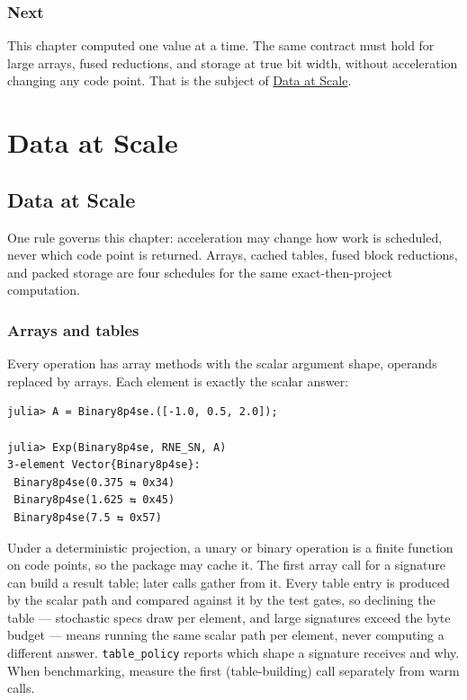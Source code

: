 \section{Next}



\label{9862256287407127426}{}


This chapter computed one value at a time. The same contract must hold for large arrays, fused reductions, and storage at true bit width, without acceleration changing any code point. That is the subject of \href{data.md}{Data at Scale}.



\part{Data at Scale}


\chapter{Data at Scale}



\label{15729904777561585153}{}


One rule governs this chapter: acceleration may change how work is scheduled, never which code point is returned. Arrays, cached tables, fused block reductions, and packed storage are four schedules for the same exact-then-project computation.



\section{Arrays and tables}



\label{4990902378038015438}{}


Every operation has array methods with the scalar argument shape, operands replaced by arrays. Each element is exactly the scalar answer:




\begin{verbatim}
julia> A = Binary8p4se.([-1.0, 0.5, 2.0]);

julia> Exp(Binary8p4se, RNE_SN, A)
3-element Vector{Binary8p4se}:
 Binary8p4se(0.375 ⇆ 0x34)
 Binary8p4se(1.625 ⇆ 0x45)
 Binary8p4se(7.5 ⇆ 0x57)
\end{verbatim}



Under a deterministic projection, a unary or binary operation is a finite function on code points, so the package may cache it. The first array call for a signature can build a result table; later calls gather from it. Every table entry is produced by the scalar path and compared against it by the test gates, so declining the table — stochastic specs draw per element, and large signatures exceed the byte budget — means running the same scalar path per element, never computing a different answer. \texttt{table\_policy} reports which shape a signature receives and why. When benchmarking, measure the first (table-building) call separately from warm calls.



